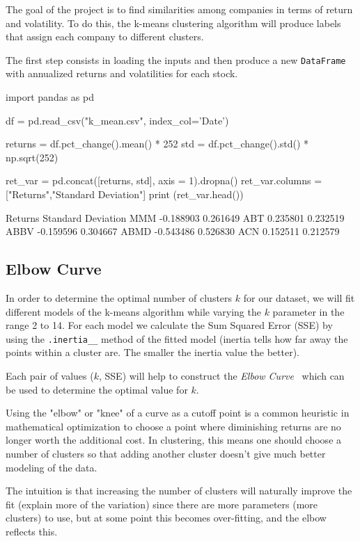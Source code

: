 The goal of the project is to find similarities among companies in terms of return and volatility. To do this, the k-means clustering algorithm will produce labels that assign each company to different clusters.
 
The first step consists in loading the inputs and then produce a new \texttt{DataFrame} with annualized returns and volatilities for each stock. 
 
\begin{ipython}
import pandas as pd
 
df = pd.read_csv("k_mean.csv", index_col='Date')
 
returns = df.pct_change().mean() * 252
std = df.pct_change().std() * np.sqrt(252)
 
ret_var = pd.concat([returns, std], axis = 1).dropna()
ret_var.columns = ["Returns","Standard Deviation"]
print (ret_var.head())
\end{ipython}
\begin{ioutput}
       Returns  Standard Deviation
MMM  -0.188903            0.261649
ABT   0.235801            0.232519
ABBV -0.159596            0.304667
ABMD -0.543486            0.526830
ACN   0.152511            0.212579
\end{ioutput}

\subsection{Elbow Curve}
 
In order to determine the optimal number of clusters $k$ for our dataset, we will fit different models of the k-means algorithm while varying the $k$ parameter in the range 2 to 14. For each model we calculate the Sum Squared Error (SSE) by using the \texttt{.inertia\_\_} method of the fitted model (inertia tells how far away the points within a cluster are. The smaller the inertia value the better).
 
Each pair of values ($k$, SSE) will help to construct the \emph{Elbow Curve}~\cite{bib:elbow_curve} which can be used to determine the optimal value for $k$. 
 
Using the "elbow" or "knee" of a curve as a cutoff point is a common heuristic in mathematical optimization to choose a point where diminishing returns are no longer worth the additional cost. In clustering, this means one should choose a number of clusters so that adding another cluster doesn't give much better modeling of the data.
 
The intuition is that increasing the number of clusters will naturally improve the fit (explain more of the variation) since there are more parameters (more clusters) to use, but at some point this becomes over-fitting, and the elbow reflects this. 
 
